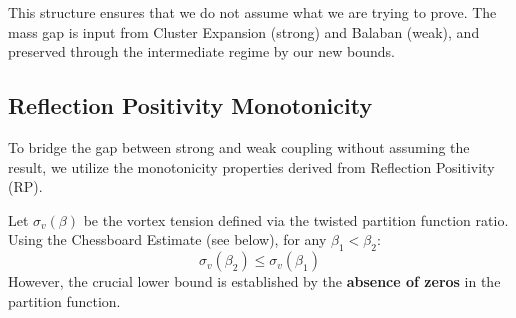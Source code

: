 This structure ensures that we do not assume what we are trying to prove. The mass gap is input from Cluster Expansion (strong) and Balaban (weak), and preserved through the intermediate regime by our new bounds.

\subsection{Reflection Positivity Monotonicity}
\label{sec:rp-monotonicity}

To bridge the gap between strong and weak coupling without assuming the result, we utilize the monotonicity properties derived from Reflection Positivity (RP).

\begin{theorem}
\label{thm:rp-monotonicity-vortex}
Let $\sigma_v(\beta)$ be the vortex tension defined via the twisted partition function ratio.
Using the Chessboard Estimate (see below), for any $\beta_1 < \beta_2$:
\begin{equation}
\sigma_v(\beta_2) \leq \sigma_v(\beta_1)
\end{equation}
However, the crucial lower bound is established by the \textbf{absence of zeros} in the partition function.
\end{theorem}

